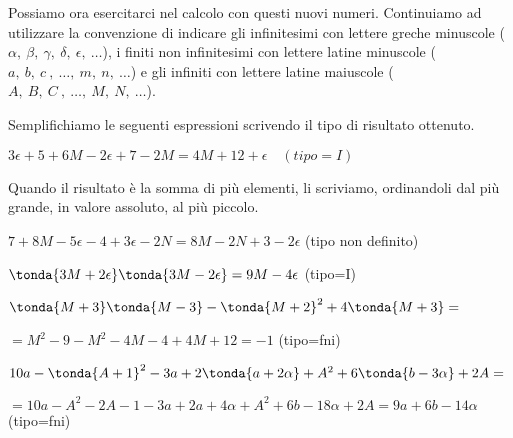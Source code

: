 Possiamo ora esercitarci nel calcolo con questi nuovi numeri. 
Continuiamo ad utilizzare la convenzione di indicare gli 
infinitesimi con lettere greche minuscole
($\alpha,~\beta,~\gamma,~\delta,~\epsilon,~\dots$), 
i finiti non infinitesimi con lettere latine minuscole 
($a,~b,~c~,~\dots,~m,~n,~\dots$) 
e gli infiniti con lettere latine maiuscole 
($A,~B,~C~,~\dots,~M,~N,~\dots$).

\begin{exrig}
Semplifichiamo le seguenti espressioni scrivendo il tipo di risultato ottenuto.

 \begin{esempio}
  $3\epsilon +5 +6M -2\epsilon +7 -2M = 4M +12 +\epsilon \quad (tipo=I)$
 \end{esempio}

\begin{osservazione}
Quando il risultato è la somma di più elementi, li scriviamo, ordinandoli dal 
più grande, in valore assoluto, al più piccolo.
\end{osservazione}

 \begin{esempio}
\(7 +8M -5\epsilon  -4 +3\epsilon-2N = 8M -2N +3 -2\epsilon\)
\quad (tipo non definito)
 \end{esempio}
 
 \begin{esempio}
\(\tonda{3M +2\epsilon} \tonda{3M -2\epsilon} = 9M -4\epsilon\)
\quad (tipo=I)
 \end{esempio}
 
 \begin{esempio}
\(\tonda{M +3} \tonda{M -3} - \tonda{M+2}^2 +4\tonda{M +3}=\)

\(=M^2 -9 -M^2 -4M -4 +4M +12 = -1\)
\quad (tipo=fni)
 \end{esempio}
 
 \begin{esempio}
\(10a -\tonda{A +1}^2 -3a +2\tonda{a+2\alpha} +A^2 +6\tonda{b -3\alpha} +2A= \)

\(=10a -A^2 -2A -1 -3a +2a+4\alpha +A^2 +6b -18\alpha +2A = 9a +6b -14\alpha\) 
\quad (tipo=fni)
 \end{esempio}
\end{exrig}


